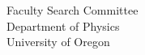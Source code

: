 \documentclass[11pt]{letter}
\begin{document}
\begin{letter}{
               Faculty Search Committee \\
               Department of Physics \\
               University of Oregon
           }


\end{letter}
\end{document}
